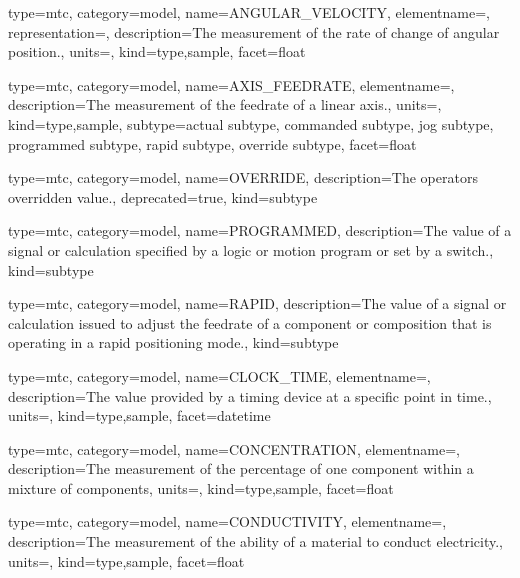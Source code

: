 {
  type=mtc,
  category=model,
  name={ANGULAR\_VELOCITY},
  elementname=,
  representation=,
  description={The measurement of the rate of change of angular position.},
  units=,
  kind={type,sample},
  facet={\gls{float}}
}


{
  type=mtc,
  category=model,
  name={AXIS\_FEEDRATE},
  elementname=,
  description={The measurement of the feedrate of a linear axis.},
  units=,
  kind={type,sample},
  subtype={\gls{actual subtype}, \gls{commanded subtype}, \gls{jog subtype}, \gls{programmed subtype}, \gls{rapid subtype}, \gls{override subtype}},
  facet={\gls{float}}
}



{
  type=mtc,
  category=model,
  name={OVERRIDE},
  description={The operators overridden value.},
  deprecated={true},
  kind={subtype}
}


{
  type=mtc,
  category=model,
  name={PROGRAMMED},
  description={The value of a signal or calculation specified by a logic or motion program or set by a switch.},
  kind={subtype}
}


{
  type=mtc,
  category=model,
  name={RAPID},
  description={The value of a signal or calculation issued to adjust the feedrate of a component or composition that is operating in a rapid positioning mode.},
  kind={subtype}
}


{
  type=mtc,
  category=model,
  name={CLOCK\_TIME},
  elementname=,
  description={The value provided by a timing device at a specific point in time.},
  units=,
  kind={type,sample},
  facet={\gls{datetime}}
}


{
  type=mtc,
  category=model,
  name={CONCENTRATION},
  elementname=,
  description={The measurement of the percentage of one component within a mixture of components},
  units=,
  kind={type,sample},
  facet={\gls{float}}
}


{
  type=mtc,
  category=model,
  name={CONDUCTIVITY},
  elementname=,
  description={The measurement of the ability of a material to conduct electricity.},
  units=,
  kind={type,sample},
  facet={\gls{float}}
}


